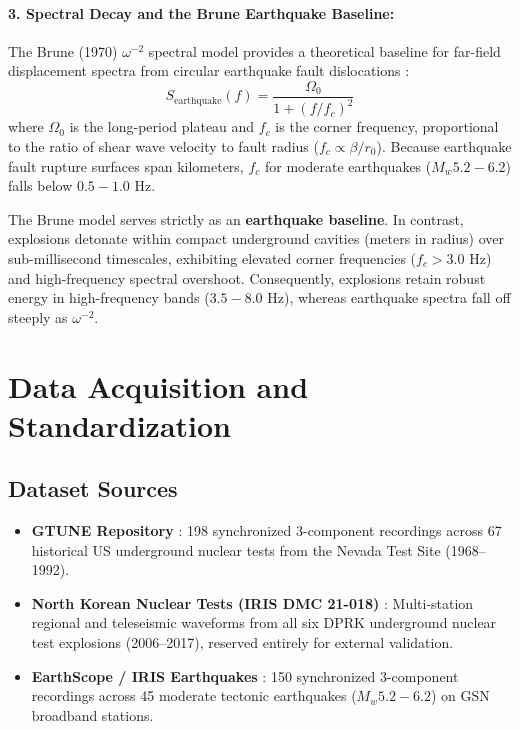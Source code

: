 \documentclass[11pt,a4paper]{article}
\begin{document}
\paragraph{3. Spectral Decay and the Brune Earthquake Baseline:}
The Brune (1970) $\omega^{-2}$ spectral model provides a theoretical baseline for far-field displacement spectra from circular earthquake fault dislocations \cite{brune1970}:
\begin{equation}
    S_{\text{earthquake}}(f) = \frac{\Omega_0}{1 + (f / f_c)^2}
\end{equation}
where $\Omega_0$ is the long-period plateau and $f_c$ is the corner frequency, proportional to the ratio of shear wave velocity to fault radius ($f_c \propto \beta / r_0$). Because earthquake fault rupture surfaces span kilometers, $f_c$ for moderate earthquakes ($M_w 5.2 - 6.2$) falls below $0.5 - 1.0\text{ Hz}$.

The Brune model serves strictly as an \textbf{earthquake baseline}. In contrast, explosions detonate within compact underground cavities (meters in radius) over sub-millisecond timescales, exhibiting elevated corner frequencies ($f_c > 3.0\text{ Hz}$) and high-frequency spectral overshoot. Consequently, explosions retain robust energy in high-frequency bands ($3.5 - 8.0\text{ Hz}$), whereas earthquake spectra fall off steeply as $\omega^{-2}$.


\section{Data Acquisition and Standardization}

\subsection{Dataset Sources}
\begin{itemize}
    \item \textbf{GTUNE Repository} \cite{barama2022}: 198 synchronized 3-component recordings across 67 historical US underground nuclear tests from the Nevada Test Site (1968--1992).
    \item \textbf{North Korean Nuclear Tests (IRIS DMC 21-018)} \cite{iris21018}: Multi-station regional and teleseismic waveforms from all six DPRK underground nuclear test explosions (2006--2017), reserved entirely for external validation.
    \item \textbf{EarthScope / IRIS Earthquakes} \cite{earthscope_earthquakes}: 150 synchronized 3-component recordings across 45 moderate tectonic earthquakes ($M_w 5.2 - 6.2$) on GSN broadband stations.
\end{itemize}
\end{document}
